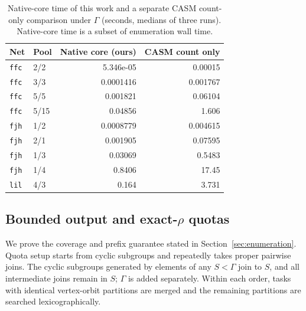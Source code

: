 \documentclass[a5paper, 10pt]{article}
\begin{document}
\begin{table}[H]
\centering\scriptsize
\caption{Native-core time of this work and a separate CASM count-only comparison under $\Gamma$ (seconds, medians of three runs). Native-core time is a subset of enumeration wall time.}
\begin{tabular}{llrr}
\toprule
Net & Pool & Native core (ours) & CASM count only \\
\midrule
\texttt{ffc} & 2/2 & 5.346e-05 & 0.00015 \\
\texttt{ffc} & 3/3 & 0.0001416 & 0.001767 \\
\texttt{ffc} & 5/5 & 0.001821 & 0.06104 \\
\texttt{ffc} & 5/15 & 0.04856 & 1.606 \\
\texttt{fjh} & 1/2 & 0.0008779 & 0.004615 \\
\texttt{fjh} & 2/1 & 0.001905 & 0.07595 \\
\texttt{fjh} & 1/3 & 0.03069 & 0.5483 \\
\texttt{fjh} & 1/4 & 0.8406 & 17.45 \\
\texttt{lil} & 4/3 & 0.164 & 3.731 \\
\bottomrule
\end{tabular}
\end{table}

\endgroup

\subsection{Bounded output and exact-$\rho$ quotas}
\label{app:quota_proof}

We prove the coverage and prefix guarantee stated in Section~\ref{sec:enumeration}. Quota setup starts from cyclic subgroups and repeatedly takes proper pairwise joins. The cyclic subgroups generated by elements of any $S<\Gamma$ join to $S$, and all intermediate joins remain in $S$; $\Gamma$ is added separately. Within each order, tasks with identical vertex-orbit partitions are merged and the remaining partitions are searched lexicographically.
\end{document}
